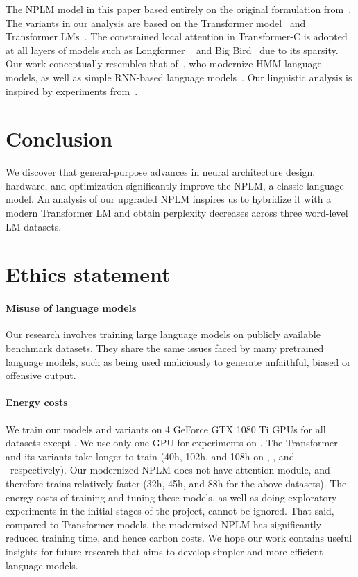 \documentclass[11pt]{article}
\begin{document}
The NPLM model in this paper based entirely on the original formulation from~\citet{Bengio2003ANP}.
The variants in our analysis are based on the Transformer model~\citep{NIPS2017_3f5ee243} and Transformer LMs~\cite{baevski2018adaptive, dehghani2018universal,dai-etal-2019-transformer,sukhbaatar-etal-2019-adaptive,knnlm,lm-with-transformers,press-etal-2020-improving,mandava2020pay,press2020shortformer}. 
The constrained local attention in Transformer-C is adopted at all layers of models such as Longformer ~\cite{Beltagy2020Longformer} and Big Bird~\cite{zaheer2020big} due to its sparsity. Our work conceptually resembles that of~\citet{chiu-rush-2020-scaling}, who modernize HMM language models, as well as simple RNN-based language models~\cite{merity2018analysis}. Our linguistic analysis is inspired by experiments from~\citet{khandelwal-etal-2018-sharp}. \section{Conclusion}
We discover that general-purpose advances in neural architecture design, hardware, and optimization significantly improve the NPLM, a classic language model. An analysis of our upgraded NPLM inspires us to hybridize it with a modern Transformer LM and obtain perplexity decreases across three word-level LM datasets.
%
 \section*{Ethics statement}

\paragraph{Misuse of language models}
Our research involves training large language models on publicly available benchmark datasets. They share the same issues faced by many pretrained language models, such as being used maliciously to generate unfaithful, biased or offensive output.

\paragraph{Energy costs}
We train our models and variants on 4 GeForce GTX 1080 Ti GPUs for all datasets except \wttwo.  We use only one GPU for experiments on \wttwo. The Transformer and its variants take longer to train (40h, 102h, and 108h on \wtthree, \lambada, and \enwik\ respectively). Our modernized NPLM does not have attention module, and therefore trains relatively faster (32h, 45h, and 88h for the above datasets). The energy costs of training and tuning these models, as well as doing exploratory experiments in the initial stages of the project, cannot be ignored. That said, compared to Transformer models, the modernized NPLM has significantly reduced training time, and hence carbon costs. We hope our work contains useful insights for future research that aims to develop simpler and more efficient language models. 
\end{document}
